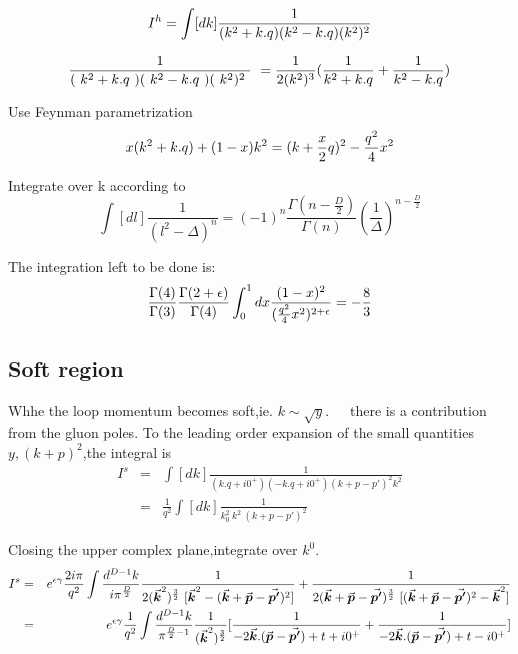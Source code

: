\documentclass{article}
\begin{document}
\begin{equation}
I^h=\int[dk]\frac{1}{(k^2+k.q)(k^2-k.q)(k^2)^2}\\
\end{equation}

\begin{equation*}
\frac{1}{(\ k^2+k.q\ )(\ k^2-k.q\ )(\ k^2)^2\ }\ =\frac{1}{2(k^2)^3}(\frac{1}{k^2+k.q}+\frac{1}{k^2-k.q})\\
\vspace{0.2cm}
\end{equation*}

Use Feynman parametrization\\
\begin{equation}
{x (k^2+k.q) + (1-x) k^2 = (k+\frac{x}{2}q)^2 -\frac{q^2}{4} x^2}\\
\end{equation}

Integrate over k according to\\
\begin{equation}
\int[dl]\frac{1}{(l^2-\Delta)^n}=(-1)^n\frac{\Gamma(n-\frac{D}{2})}{\Gamma(n)}(\frac{1}{\Delta})^{n-\frac{D}{2}}
\end{equation}


The integration left to be done is:\\
\begin{equation}
\frac{\Gamma(4)}{\Gamma(3)}\frac{\Gamma(2+\epsilon)}{\Gamma(4)}\int^1_0dx \frac{(1-x)^2}{(\frac{q^2}{4}x^2)^{2+\epsilon}}=-\frac{8}{3}\\
\end{equation}

\subsection{Soft region }
Whhe the loop momentum becomes soft,ie. $k\sim \sqrt{y}$.~~~there is a contribution from the gluon poles. To the leading order expansion of the small quantities $y,(k+p)^2$,the integral is\\

\begin{eqnarray}
I^s&=&\int[dk]\frac{1}{(k.q+i0^+)(-k.q+i0^+)(k+p-p')^2k^2}\nonumber\\
&=&\frac{1}{q^2}\int[dk]\frac{1}{k_0^2~k^2~(k+p-p')^2}
\end{eqnarray}


Closing the upper complex plane,integrate over $k^0$.\\

\begin{eqnarray*}%
I^s&=&e^{\epsilon\gamma}\frac{2i\pi}{q^2}\int\frac{d^{D-1}k}{i\pi^\frac{D}{2}}{\frac{1}{2(\va*{k}^2)^\frac{3}{2}~[\va*{k}^2-(\va*{k}+\va*{p}-\va*{p'})^2]}+
{\frac{1}{2(\va*{k}+\va*{p}-\va*{p'})^\frac{3}{2}~[(\va*{k}+\va*{p}-\va*{p'})^2-\va*{k}^2]}}}\nonumber\\
&=&e^{\epsilon\gamma}\frac{1}{q^2}\int\frac{d^{D-1}k}{\pi^{\frac{D}{2}-1}}\frac{1}{(\va*{k}^2)^\frac{3}{2}}[\frac{1}{-2\va*{k}.(\va*{p}-\va*{p'})+t+i0^+}+\frac{1}{-2\va*{k}.(\va*{p}-\va*{p'})+t-i0^+}]\\
\end{eqnarray*}
\end{document}
